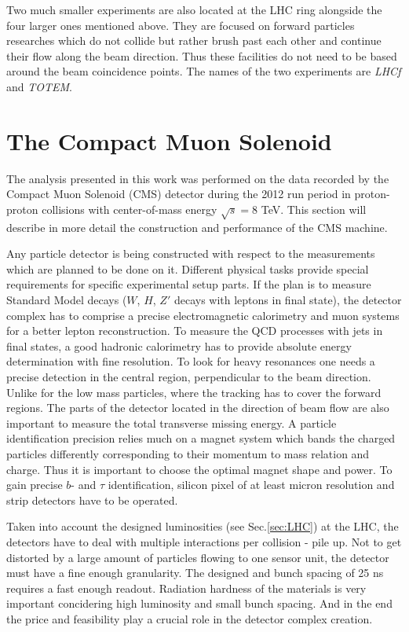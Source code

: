 Two much smaller experiments are also located at the LHC ring alongside the four larger ones mentioned above. They are focused on forward particles
researches which do not collide but rather brush past each other and continue their flow along the beam direction. Thus these facilities do not
need to be based around the beam coincidence points. The names of the two experiments are \textit{LHCf} and \textit{TOTEM}.

\section{The Compact Muon Solenoid}\label{sec:CMS}

The analysis presented in this work was performed on the data recorded by the Compact Muon Solenoid (CMS) detector\cite{CMSatLHC} during the 2012
run period in proton-proton collisions with center-of-mass energy $\sqrt{s} = $8 TeV. This section will describe in more detail 
the construction and performance of the CMS machine.

Any particle detector is being constructed with respect to the measurements which are planned to be done on it. Different physical
tasks provide special requirements for specific experimental setup parts. If the plan is to measure Standard Model decays
($W$, $H$, $Z'$ decays with leptons in final state), the detector complex has to comprise a precise electromagnetic calorimetry and 
muon systems for a better lepton reconstruction. To measure the QCD processes with jets in final states, a
good hadronic calorimetry has to provide absolute energy determination with fine resolution. To look for heavy resonances one needs a
precise detection in the central region, perpendicular to the beam direction. Unlike for the low mass particles, where the tracking
has to cover the forward regions. The parts of the detector located in the direction of beam flow are also important to measure the 
total transverse missing energy. A particle identification precision relies much on a magnet system which bands the charged 
particles differently corresponding to their momentum to mass relation and charge. Thus it is important to choose the optimal magnet
shape and power. To gain precise $b$- and $\tau$ identification, silicon
pixel of at least micron resolution and strip detectors have to be operated. 

Taken into account the designed luminosities (see Sec.\ref{sec:LHC}) at the LHC,
the detectors have to deal with multiple interactions per collision - pile up. Not to get distorted by a large amount of particles 
flowing to one sensor unit, the detector must have a fine enough granularity. The designed and bunch spacing of 25 ns 
requires a fast enough readout. Radiation hardness of the materials is very important concidering high luminosity and small
bunch spacing. And in the end the price and feasibility play a crucial role in the detector complex creation.

